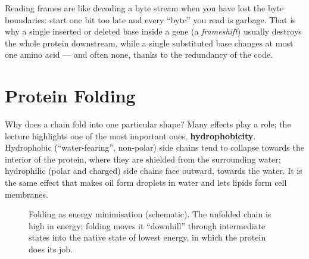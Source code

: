 \documentclass[11pt, oneside]{book}
\let\originalsection\section
\renewcommand{\section}{\Needspace{7\baselineskip}\originalsection}
\begin{document}
\begin{intbox}
Reading frames are like decoding a byte stream when you have lost the byte
boundaries: start one bit too late and every ``byte'' you read is garbage.
That is why a single inserted or deleted base inside a gene (a
\emph{frameshift}) usually destroys the whole protein downstream, while a
single substituted base changes at most one amino acid --- and often none,
thanks to the redundancy of the code.
\end{intbox}

\section{Protein Folding}

Why does a chain fold into one particular shape? Many effects play a role;
the lecture highlights one of the most important ones,
\textbf{hydrophobicity}. Hydrophobic (``water-fearing'', non-polar) side
chains tend to collapse towards the interior of the protein, where they are
shielded from the surrounding water; hydrophilic (polar and charged) side
chains face outward, towards the water. It is the same effect that makes oil
form droplets in water and lets lipids form cell membranes.

\begin{figure}[htbp]
\centering
{}
\caption{Folding as energy minimisation (schematic). The unfolded chain is
high in energy; folding moves it ``downhill'' through intermediate states
into the native state of lowest energy, in which the protein does its job.}
\label{fig:folding}
\end{figure}
\end{document}

